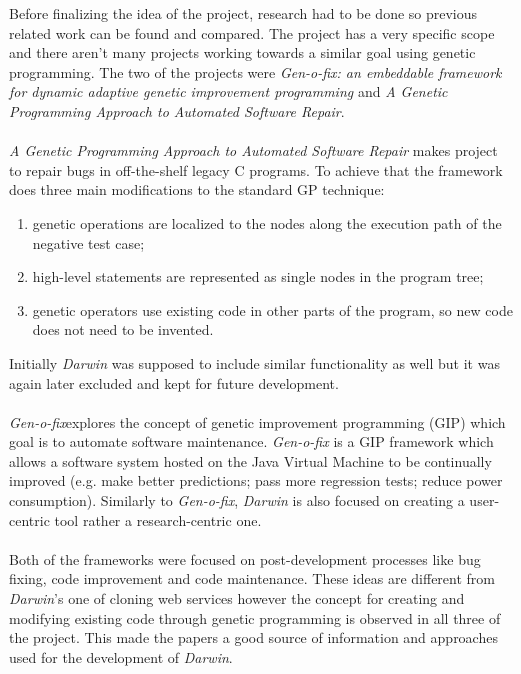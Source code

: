 Before finalizing the idea of the project, research had to be done so previous related work can be found and compared. The project has a very
specific scope and there aren't many projects working towards a similar goal using genetic programming. The two of the projects were
\textit{Gen-o-fix: an embeddable framework for dynamic adaptive genetic improvement programming}\cite{genofix} and \textit{A Genetic Programming Approach to
Automated Software Repair}\cite{softrepair}.
\paragraph{}
\textit{A Genetic Programming Approach to Automated Software Repair} makes project to repair bugs in off-the-shelf legacy C programs.
To achieve that the framework does three main modifications to the standard GP technique:
\begin{enumerate} 
\item genetic operations are localized to the nodes along the execution path of the negative test case; 
\item high-level statements are represented as single nodes in the program tree;
\item genetic operators use existing code in other parts of the program, so new code does not need to be invented.
\end{enumerate}
 Initially \textit{Darwin} was supposed to include similar functionality as well but it was again later excluded and kept for future development.
\paragraph{}
\textit{Gen-o-fix}explores the concept of  genetic improvement programming (GIP) which goal is to automate software
maintenance. \textit{Gen-o-fix} is a GIP framework which allows a software system hosted on the Java Virtual Machine to be continually improved
(e.g. make better predictions; pass more regression tests; reduce power consumption). Similarly to \textit{Gen-o-fix},
\textit{Darwin} is also focused on creating a user-centric tool rather a research-centric one.
\paragraph{}
Both of the frameworks were focused on post-development processes like bug fixing, code improvement and code maintenance. These ideas are different
from \textit{Darwin}'s one of cloning web services however the concept for creating and modifying existing code through genetic programming is observed
in all three of the project. This made the papers a good source of information and approaches used for the development of \textit{Darwin}.